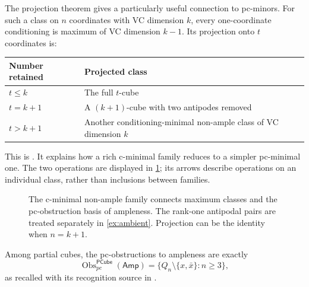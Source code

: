 \documentclass[11pt]{article}
\theoremstyle{definition}
\newcommand{\Amp}{\mathsf{Amp}}
\newcommand{\PCube}{\mathsf{PCube}}
\newcommand{\VC}{\operatorname{VC}}
\newcommand{\Obs}{\operatorname{Obs}}
\begin{document}
The projection theorem gives a particularly useful connection to pc-minors.
For such a class on $n$ coordinates with VC dimension $k$, every one-coordinate
conditioning is maximum of VC dimension $k-1$. Its projection onto $t$
coordinates is:
\begin{center}
\begin{tabular}{@{}ll@{}}
\toprule
Number retained & Projected class\\
\midrule
$t\le k$ & The full $t$-cube\\
$t=k+1$ & A $(k+1)$-cube with two antipodes removed\\
$t>k+1$ & Another conditioning-minimal non-ample class of VC dimension $k$\\
\bottomrule
\end{tabular}
\end{center}
This is \cite[Theorem on the structure of a minimal non-ample class]{MNA}.
It explains how a rich c-minimal family reduces to a simpler pc-minimal one.
The two operations are displayed in \cref{fig:nonample-operations}; its
arrows describe operations on an individual class, rather than inclusions
between families.

\begin{figure}[htbp]
\centering
{}
\caption{The c-minimal non-ample family connects maximum classes and the
pc-obstruction basis of ampleness. The rank-one antipodal pairs are treated
separately in \cref{ex:ambient}. Projection can be the identity when
$n=k+1$.}
\label{fig:nonample-operations}
\end{figure}

Among partial cubes, the pc-obstructions to ampleness are exactly
\[
 \Obs_{pc}^{\PCube}(\Amp)
 =\{Q_n\setminus\{x,\bar x\}:n\ge3\},
\]
as recalled with its recognition source in \cite{Daisy,Partition}.
\end{document}
